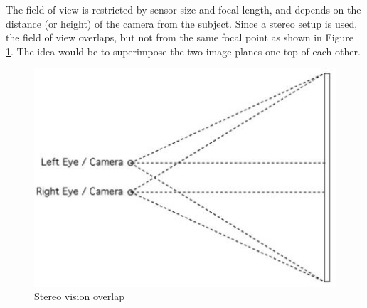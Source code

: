 The field of view is restricted by sensor size and focal length, and depends on the distance (or height) of the camera from the subject. Since a stereo setup is used, the field of view overlaps, but not from the same focal point as shown in Figure \ref{fig:stereo_overlap}. The idea would be to superimpose the two image planes one top of each other.

\begin{figure}[H]
\centering
\includegraphics[scale=0.45]{images/stero_overlap.jpg}
\caption{Stereo vision overlap}
\label{fig:stereo_overlap}
\end{figure}

